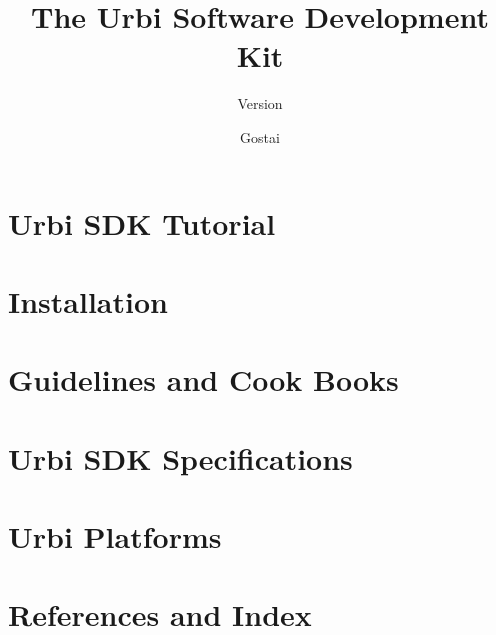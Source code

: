 \documentclass{gostai-report}
\title{The Urbi Software Development Kit}
\subtitle{Version \VcsDescription}
\author{Gostai}
\begin{document}
\maketitle



\tableofcontents

\part{Urbi SDK Tutorial}
\label{part:tut}





\part{Installation}
\label{part:install}


\part{Guidelines and Cook Books}
\label{part:guide}



\part{Urbi SDK Specifications}
\label{part:specs}


\part{Urbi Platforms}
\label{part:platforms}


\part{References and Index}
\label{part:ref}


\chapterIndex
\end{document}
